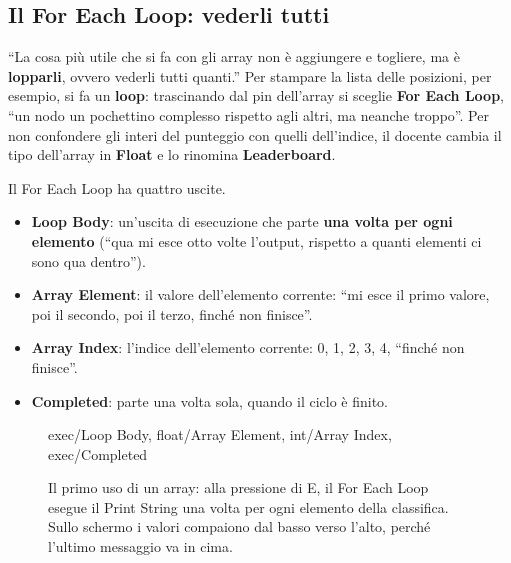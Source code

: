 \subsection{Il For Each Loop: vederli tutti}

``La cosa più utile che si fa con gli array non è aggiungere e togliere, ma è
\textbf{lopparli}, ovvero vederli tutti quanti.'' Per stampare la lista delle
posizioni, per esempio, si fa un \textbf{loop}: trascinando dal pin dell'array
si sceglie \textbf{For Each Loop}, ``un nodo un pochettino complesso rispetto
agli altri, ma neanche troppo''. Per non confondere gli interi del punteggio con
quelli dell'indice, il docente cambia il tipo dell'array in \textbf{Float} e lo
rinomina \textbf{Leaderboard}.

Il For Each Loop ha quattro uscite.
\begin{itemize}
  \item \textbf{Loop Body}: un'uscita di esecuzione che parte \textbf{una
        volta per ogni elemento} (``qua mi esce otto volte l'output, rispetto a
        quanti elementi ci sono qua dentro'').
  \item \textbf{Array Element}: il valore dell'elemento corrente: ``mi esce il
        primo valore, poi il secondo, poi il terzo, finché non finisce''.
  \item \textbf{Array Index}: l'indice dell'elemento corrente: 0, 1, 2, 3, 4,
        ``finché non finisce''.
  \item \textbf{Completed}: parte una volta sola, quando il ciclo è finito.
\end{itemize}

\begin{figure}[htbp]
\centering
\begin{bpgraph}
    {exec/Loop Body, float/Array Element, int/Array Index, exec/Completed}
\end{bpgraph}
\caption{Il primo uso di un array: alla pressione di E, il For Each Loop esegue
il Print String una volta per ogni elemento della classifica. Sullo schermo i
valori compaiono dal basso verso l'alto, perché l'ultimo messaggio va in cima.}
\label{gd12:fig:foreach}
\end{figure}

